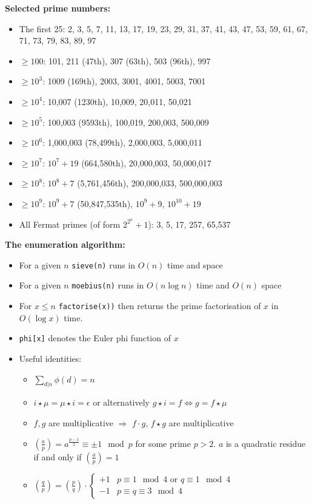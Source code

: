 \noindent\textbf{Selected prime numbers:}
\begin{itemize}
	\item The first 25: 2, 3, 5, 7, 11, 13, 17, 19, 23, 29, 31, 37, 41, 43, 47, 53, 59, 61, 67, 71, 73, 79, 83, 89, 97
	\item $\geq 100$: 101, 211 (47th), 307 (63th), 503 (96th), 997 
	\item $\geq 10^3$: 1009 (169th), 2003, 3001, 4001, 5003, 7001%
	\item $\geq 10^4$: 10,007 (1230th), 10,009, 20,011, 50,021%
	\item $\geq 10^5$: 100,003 (9593th), 100,019, 200,003, 500,009%
	\item $\geq 10^6$: 1,000,003 (78,499th), 2,000,003, 5,000,011%
	\item $\geq 10^7$: $10^7 + 19$ (664,580th), 20,000,003, 50,000,017%
	\item $\geq 10^8$: $10^8 + 7$ (5,761,456th), 200,000,033, 500,000,003
	\item $\geq 10^9$: $10^9 + 7$ (50,847,535th), $10^9 + 9$, $10^{10} + 19$
	\item All Fermat primes (of form $2^{2^n} + 1$): 3, 5, 17, 257, 65,537
\end{itemize}

\noindent\textbf{The enumeration algorithm:}
\begin{itemize}
	\item For a given $n$ \lstinline{sieve(n)} runs in $O(n)$ time and space
	\item For a given $n$ \lstinline{moebius(n)} runs in $O(n\log n)$ time and $O(n)$ space
	\item For $x \le n$ \lstinline{factorise(x))} then returns the prime factorisation of $x$ in $O(\log x)$ time.
	\item \lstinline{phi[x]} denotes the Euler phi function of $x$
	\item Useful identities:
	\begin{itemize}
		\item $\sum_{d | n} \phi(d) = n$
		\item $i \star \mu = \mu \star i = \epsilon$ or alternatively $g \star i = f \Leftrightarrow g = f \star \mu$
		\item $f,g$ are multiplicative $\Rightarrow$ $f\cdot g$, $f\star g$ are multiplicative
		\item $\left(\frac{a}{p}\right) = a^{\frac{p-1}{2}} \equiv \pm 1 \mod p$ for some prime $p > 2$. $a$ is a quadratic residue if and only if $\left(\frac{a}{p}\right) = 1$
		\item $\left(\frac{q}{p}\right) = \left(\frac{p}{q}\right)\cdot\begin{cases}+1 & p \equiv 1 \mod 4 \text{ or } q \equiv 1 \mod 4\\ -1 & p \equiv q \equiv 3 \mod 4 \end{cases}$
	\end{itemize}
\end{itemize}